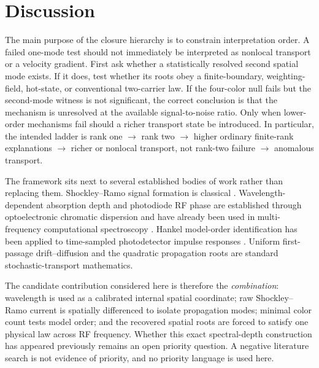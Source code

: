 \documentclass[11pt]{article}
\begin{document}
\section{Discussion}

The main purpose of the closure hierarchy is to constrain interpretation order. A failed one-mode test should not immediately be interpreted as nonlocal transport or a velocity gradient. First ask whether a statistically resolved second spatial mode exists. If it does, test whether its roots obey a finite-boundary, weighting-field, hot-state, or conventional two-carrier law. If the four-color null fails but the second-mode witness is not significant, the correct conclusion is that the mechanism is unresolved at the available signal-to-noise ratio. Only when lower-order mechanisms fail should a richer transport state be introduced. In particular, the intended ladder is rank one $\rightarrow$ rank two $\rightarrow$ higher ordinary finite-rank explanations $\rightarrow$ richer or nonlocal transport, not rank-two failure $\rightarrow$ anomalous transport.

The framework sits next to several established bodies of work rather than replacing them. Shockley--Ramo signal formation is classical \cite{Shockley1938,Ramo1939,Dabrowski1989}. Wavelength-dependent absorption depth and photodiode RF phase are established through optoelectronic chromatic dispersion \cite{Glasser2021} and have already been used in multi-frequency computational spectroscopy \cite{Kassa2026}. Hankel model-order identification has been applied to time-sampled photodetector impulse responses \cite{Sun2025}. Uniform first-passage drift--diffusion and the quadratic propagation roots are standard stochastic-transport mathematics.

The candidate contribution considered here is therefore the \emph{combination}: wavelength is used as a calibrated internal spatial coordinate; raw Shockley--Ramo current is spatially differenced to isolate propagation modes; minimal color count tests model order; and the recovered spatial roots are forced to satisfy one physical law across RF frequency. Whether this exact spectral-depth construction has appeared previously remains an open priority question. A negative literature search is not evidence of priority, and no priority language is used here.
\end{document}
